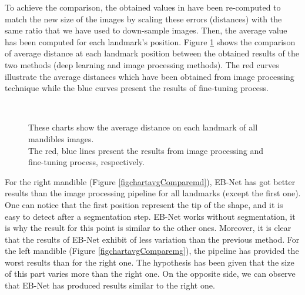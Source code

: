 \documentclass[review]{elsarticle}
\begin{document}
To achieve the comparison, the obtained values in \cite{le2017maelab} have been re-computed to match the new size of the images by scaling these errors (distances) with the same ratio that we have used to down-sample images. Then, the average value has been computed for each landmark’s position. Figure \ref{figchartavgCompare} shows the comparison of average distance at each landmark position between the obtained results of the two methods (deep learning and image processing methods). The red curves illustrate the average distances which have been obtained from image processing technique while the blue curves present the results of fine-tuning process. 

\begin{figure}[h!]
    \centering
	~~    
    \caption{These charts show the average distance on each landmark of all mandibles images.\\ The red, blue lines present the results from image processing and fine-tuning process, respectively.}
    \label{figchartavgCompare}
\end{figure}

For the right mandible (Figure \ref{figchartavgComparemd}), EB-Net has got better results than the image processing pipeline for all landmarks (except the first one). One can notice that the first position represent the tip of the shape, and it is easy to detect after a segmentation step. EB-Net works without segmentation, it is why the result for this point is similar to the other ones. Moreover, it is clear that the results of EB-Net exhibit of less variation than the previous method. For the left mandible (Figure \ref{figchartavgComparemg}), the pipeline has provided the worst results than for the right one. The hypothesis has been given that the size of this part varies more than the right one. On the opposite side, we can observe that EB-Net has produced results similar to the right one.
\end{document}
